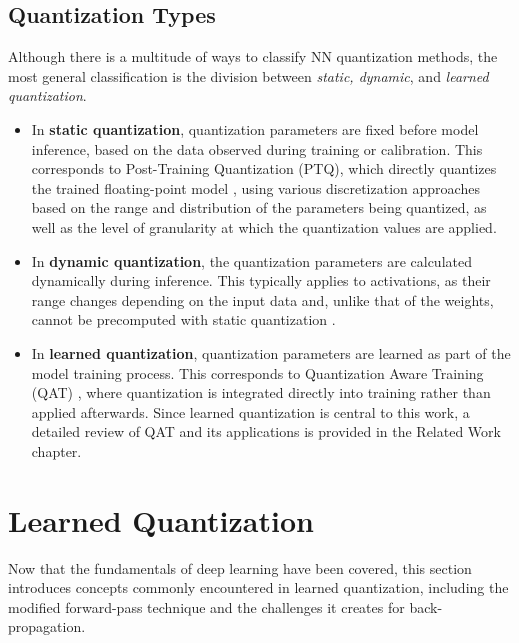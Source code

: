 \subsection{Quantization Types}
\label{subsec:subsection2}

Although there is a multitude of ways to classify NN quantization methods, the most general classification is the division between \textit{static, dynamic}, and \textit{learned quantization}.
    \begin{itemize}
        \item In \textbf{static quantization}, quantization parameters are fixed before model inference, based on the data observed during training or calibration.
        This corresponds to Post-Training Quantization (PTQ), which directly quantizes the trained floating-point model \cite{jiang2021efficient}, 
        using various discretization approaches based on the range and distribution of the parameters being quantized, 
        as well as the level of granularity at which the quantization values are applied.
        
        \item In \textbf{dynamic quantization}, the quantization parameters are calculated dynamically during inference. 
        This typically applies to activations, as their range changes depending on the input data and, unlike that of the weights, 
        cannot be precomputed with static quantization \cite{kim2021ibert}.
        
        \item In \textbf{learned quantization}, quantization parameters are learned as part of the model training process.
        This corresponds to Quantization Aware Training (QAT) \cite{jacob2018quantization}, where quantization is integrated directly into training rather than applied afterwards.
        Since learned quantization is central to this work, a detailed review of QAT and its applications is provided in the Related Work chapter. 

    \end{itemize}


\section{Learned Quantization}
\label{sec:section3}
Now that the fundamentals of deep learning have been covered, 
this section introduces concepts commonly encountered in learned quantization, 
including the modified forward-pass technique and the challenges it creates for back-propagation.

